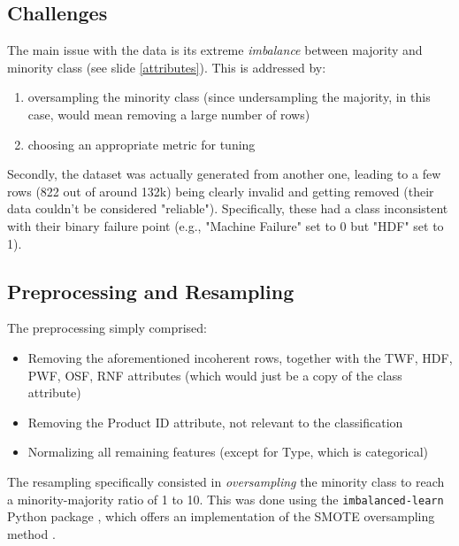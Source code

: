 \subsection{Challenges}
\begin{frame}{\subsecname}
The main issue with the data is its extreme \textit{imbalance} between majority and minority class (see slide \ref{attributes}). This is addressed by:
\begin{enumerate}
    \justifying
    \small
    \item oversampling the minority class (since undersampling the majority, in this case, would mean removing a large number of rows)
    \item choosing an appropriate metric for tuning
\end{enumerate}

Secondly, the dataset was actually generated from another one, leading to a few rows (822 out of around 132k) being clearly invalid and getting removed (their data couldn't be considered "reliable"). Specifically, these had a class inconsistent with their binary failure point (e.g., "Machine Failure" set to 0 but "HDF" set to 1).
\end{frame}

\subsection{Preprocessing and Resampling}
\begin{frame}{\subsecname}
The preprocessing simply comprised:
\begin{itemize}
    \small
    \justifying
    \item Removing the aforementioned incoherent rows, together with the TWF, HDF, PWF, OSF, RNF attributes (which would just be a copy of the class attribute)
    \item Removing the Product ID attribute, not relevant to the classification
    \item Normalizing all remaining features (except for Type, which is categorical)
\end{itemize}

The resampling specifically consisted in \textit{oversampling} the minority class to reach a minority-majority ratio of 1 to 10. This was done using the \texttt{imbalanced-learn} Python package \cite{imblearn}, which offers an implementation of the SMOTE oversampling method \cite{DBLP:journals/corr/abs-1106-1813}.

\end{frame}